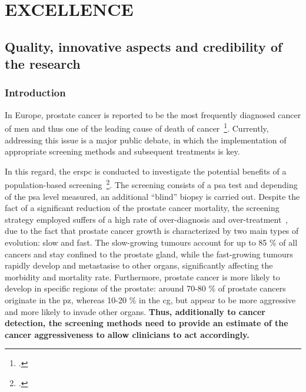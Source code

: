 \section{EXCELLENCE}
\label{sec:excellence}

\subsection{Quality, innovative aspects and credibility of the research}
\label{sec:quality}

\subsubsection{Introduction}

In Europe, prostate cancer is reported to be the most frequently diagnosed cancer of men and thus one of the leading cause of death of cancer~\footcite{Ferlay2013}. 
Currently, addressing this issue is a major public debate, in which the implementation of appropriate screening methods and subsequent treatments is key.

In this regard, the \ac{erspc} is conducted to investigate the potential benefits of a population-based screening~\footcite{Schroder2015}. 
The screening consists of a \ac{psa} test and depending of the \ac{psa} level measured, an additional ``blind'' biopsy is carried out. 
Despite the fact of a significant reduction of the prostate cancer mortality, the screening strategy employed suffers of a high rate of over-diagnosis and over-treatment~\cite{Delpierre2013,Schroder2015}, due to the fact that prostate cancer growth is characterized by two main types of evolution: slow and fast.
The slow-growing tumours account for up to 85 \% of all cancers and stay confined to the prostate gland, while the fast-growing tumours rapidly develop and metastasise to other organs, significantly affecting the morbidity and mortality rate.
Furthermore, prostate cancer is more likely to develop in specific regions of the prostate: around 70-80 \% of prostate cancers originate in the \ac{pz}, whereas 10-20 \% in the \ac{cg}, but appear to be more aggressive and more likely to invade other organs. 
\textbf{Thus, additionally to cancer detection, the screening methods need to provide an estimate of the cancer aggressiveness to allow clinicians to act accordingly.}

